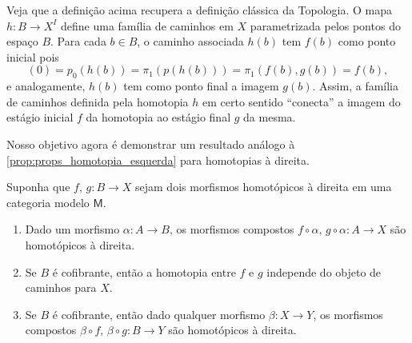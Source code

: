 Veja que a definição acima recupera a definição clássica da Topologia.
O mapa $h: B \to X^{I}$ define uma família de caminhos em $X$ parametrizada pelos pontos do espaço $B$.
Para cada $b \in B$, o caminho associada $h(b)$ tem $f(b)$ como ponto inicial pois
\begin{displaymath}
  [h(b)](0) = p_{0}(h(b)) = \pi_{1}(p(h(b))) = \pi_{1}(f(b),g(b)) = f(b),
\end{displaymath}
e analogamente, $h(b)$ tem como ponto final a imagem $g(b)$.
Assim, a família de caminhos definida pela homotopia $h$ em certo sentido ``conecta'' a imagem do estágio inicial $f$ da homotopia ao estágio final $g$ da mesma.

Nosso objetivo agora é demonstrar um resultado análogo à \cref{prop:props_homotopia_esquerda} para homotopias à direita.

\begin{prop}\label{prop:props_homotopia_direita}
  Suponha que $f,\,g: B \to X$ sejam dois morfismos homotópicos à direita em uma categoria modelo $\mathsf{M}$.
  \begin{enumerate}
  \item Dado um morfismo $\alpha: A \to B$, os morfismos compostos $f \circ \alpha,\, g \circ \alpha: A \to X$ são homotópicos à direita.
    
  \item Se $B$ é cofibrante, então a homotopia entre $f$ e $g$ independe do objeto de caminhos para $X$.
    
  \item Se $B$ é cofibrante, então dado qualquer morfismo $\beta: X \to Y$, os morfismos compostos $\beta \circ f,\, \beta \circ g: B \to Y$ são homotópicos à direita.
  \end{enumerate}
\end{prop}



